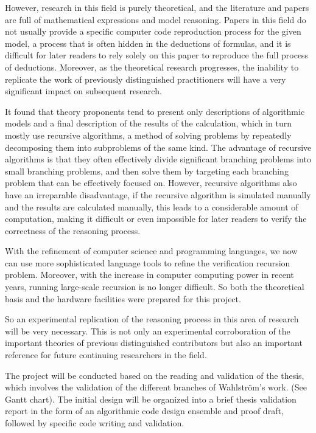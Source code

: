 \documentclass{sigchi}
\begin{document}
However, research in this field is purely theoretical, and the literature and papers are full of mathematical expressions and model reasoning. Papers in this field do not usually provide a specific computer code reproduction process for the given model, a process that is often hidden in the deductions of formulas, and it is difficult for later readers to rely solely on this paper to reproduce the full process of deductions. Moreover, as the theoretical research progresses, the inability to replicate the work of previously distinguished practitioners will have a very significant impact on subsequent research.

It found that theory proponents tend to present only descriptions of algorithmic models and a final description of the results of the calculation, which in turn mostly use recursive algorithms, a method of solving problems by repeatedly decomposing them into subproblems of the same kind. The advantage of recursive algorithms is that they often effectively divide significant branching problems into small branching problems, and then solve them by targeting each branching problem that can be effectively focused on. However, recursive algorithms also have an irreparable disadvantage, if the recursive algorithm is simulated manually and the results are calculated manually, this leads to a considerable amount of computation, making it difficult or even impossible for later readers to verify the correctness of the reasoning process.

With the refinement of computer science and programming languages, we now can use more sophisticated language tools to refine the verification recursion problem. Moreover, with the increase in computer computing power in recent years, running large-scale recursion is no longer difficult. So both the theoretical basis and the hardware facilities were prepared for this project.

So an experimental replication of the reasoning process in this area of research will be very necessary. This is not only an experimental corroboration of the important theories of previous distinguished contributors but also an important reference for future continuing researchers in the field.

The project will be conducted based on the reading and validation of the thesis, which involves the validation of the different branches of Wahlström's work. (See Gantt chart). The initial design will be organized into a brief thesis validation report in the form of an algorithmic code design ensemble and proof draft, followed by specific code writing and validation.
\end{document}
